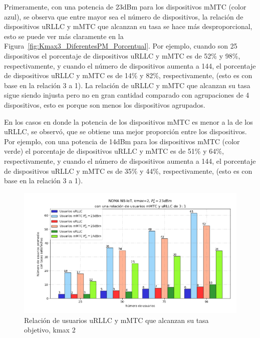 Primeramente, con una potencia de 23dBm para los dispositivos mMTC (color azul), se observa que entre mayor sea el número de dispositivos, la relación de dispositivos uRLLC y mMTC que alcanzan su tasa se hace más desproporcional, esto se puede ver más claramente en la Figura~\ref{fig:Kmax3_DiferentesPM_Porcentual}. Por ejemplo, cuando son 25 dispositivos el porcentaje de dispositivos uRLLC y mMTC es de 52\% y 98\%, respectivamente, y cuando el número de dispositivos aumenta a 144, el porcentaje de dispositivos uRLLC y mMTC es de 14\% y 82\%, respectivamente, (esto es con base en la relación 3 a 1). La relación de uRLLC y mMTC que alcanzan su tasa sigue siendo injusta pero no en gran cantidad comparado con agrupaciones de 4 dispositivos, esto es porque son menos los dispositivos agrupados.\newline

En los casos en donde la potencia de los dispositivos mMTC es menor a la de los uRLLC, se observó, que se obtiene una mejor proporción entre los dispositivos. Por ejemplo, con una potencia de 14dBm para los dispositivos mMTC (color verde) el porcentaje de dispositivos uRLLC y mMTC es de 51\% y 64\%, respectivamente, y cuando el número de dispositivos aumenta a 144, el porcentaje de dispositivos uRLLC y mMTC es de 35\% y 44\%, respectivamente, (esto es con base en la relación 3 a 1). \newline

\break

\begin{figure}[th]
    \centering
    \includegraphics[scale=.6]{Figures/ResultadosNOMA/Kmax2_DiferentesPM.png}
    \decoRule
    \caption[Relación de usuarios uRLLC y mMTC que alcanzan su tasa objetivo, kmax 2]{Relación de usuarios uRLLC y mMTC que alcanzan su tasa objetivo, kmax 2}
    \label{fig:Kmax2_DiferentesPM}
\end{figure}

